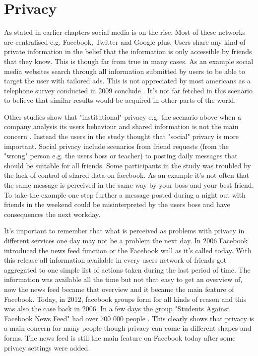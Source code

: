 \section{Privacy}
As stated in earlier chapters social media is on the rise.
Most of these networks are centralised e.g. Facebook, Twitter and Google plus.
Users share any kind of private information in the belief that the information is only accessible by friends that they know.
This is though far from true in many cases.
As an example social media websites search through all information submitted by users to be able to target the user with tailored ads.
This is not appreciated by most americans as a telephone survey conducted in 2009 conclude \cite{turow2009}.
It's not far fetched in this scenario to believe that similar results would be acquired in other parts of the world.

Other studies show that "institutional" privacy e.g. the scenario above when a company analysis its users behaviour and shared information is not the main concern \cite{raynes-goldie2010}.
Instead the users in the study thought that "social" privacy is more important.
Social privacy include scenarios from friend requests (from the "wrong" person e.g. the users boss or teacher) to posting daily messages that should be suitable for all friends.
Some participants in the study was troubled by the lack of control of shared data on facebook.
As an example it's not often that the same message is perceived in the same way by your boss and your best friend.
To take the example one step further a message posted during a night out with friends in the weekend could be misinterpreted by the users boss and have consequences the next workday.

It's important to remember that what is perceived as problems with privacy in different services one day may not be a problem the next day.
In 2006 Facebook introduced the news feed function or the Facebook wall as it's called today.
With this release all information available in every users network of friends got aggregated to one simple list of actions taken during the last period of time.
The information was available all the time but not that easy to get an overview of, now the news feed became that overview and it became the main feature of Facebook.
Today, in 2012, facebook groups form for all kinds of reason and this was also the case back in 2006.
In a few days the group "Students Against Facebook News Feed" had over 700 000 people \cite{boyd2008}.
This clearly shows that privacy is a main concern for many people though privacy can come in different shapes and forms.
The news feed is still the main feature on Facebook today after some privacy settings were added.


